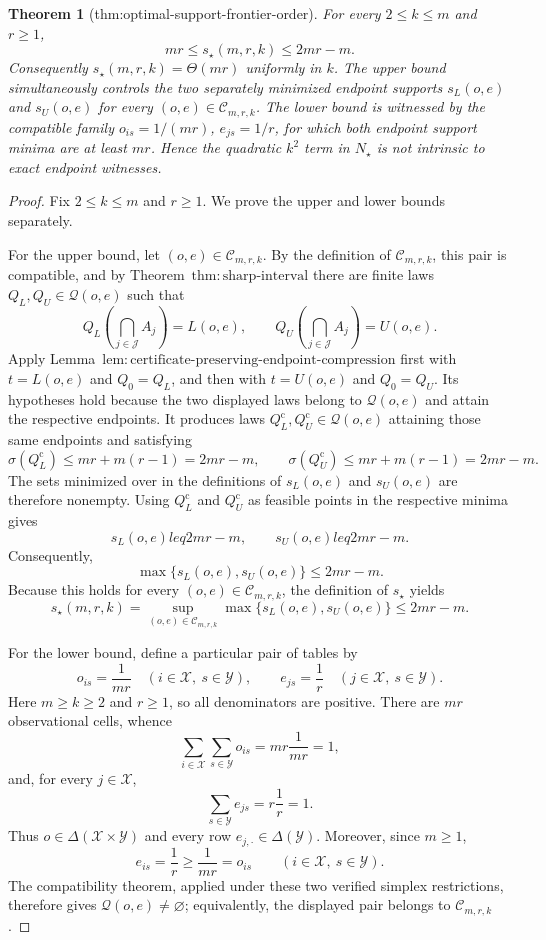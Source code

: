 \documentclass{article}
\newtheorem{theorem}{Theorem}
\begin{document}
\begin{theorem}[thm:optimal-support-frontier-order]\label{thm:optimal-support-frontier-order}
For every \(2\leq k\leq m\) and \(r\geq1\),
\[
 mr\leq s_\star(m,r,k)\leq 2mr-m.
\]
Consequently \(s_\star(m,r,k)=\Theta(mr)\) uniformly in \(k\).  The upper bound simultaneously controls the two separately minimized endpoint supports \(s_L(o,e)\) and \(s_U(o,e)\) for every \((o,e)\in\mathcal C_{m,r,k}\).  The lower bound is witnessed by the compatible family \(o_{is}=1/(mr)\), \(e_{js}=1/r\), for which both endpoint support minima are at least \(mr\).  Hence the quadratic \(k^2\) term in \(N_\star\) is not intrinsic to exact endpoint witnesses.
\end{theorem}
\begin{proof}
Fix \(2\leq k\leq m\) and \(r\geq1\).  We prove the upper and lower bounds separately.

For the upper bound, let \((o,e)\in\mathcal C_{m,r,k}\).  By the definition of \(\mathcal C_{m,r,k}\), this pair is compatible, and by Theorem~\(\mathrm{thm{:}sharp\mbox{-}interval}\) there are finite laws \(Q_L,Q_U\in\mathcal Q(o,e)\) such that
\[
 Q_L\!\left(\bigcap_{j\in\mathcal J}A_j\right)=L(o,e),
 \qquad
 Q_U\!\left(\bigcap_{j\in\mathcal J}A_j\right)=U(o,e).
\]
Apply Lemma~\(\mathrm{lem{:}certificate\mbox{-}preserving\mbox{-}endpoint\mbox{-}compression}\) first with \(t=L(o,e)\) and \(Q_0=Q_L\), and then with \(t=U(o,e)\) and \(Q_0=Q_U\).  Its hypotheses hold because the two displayed laws belong to \(\mathcal Q(o,e)\) and attain the respective endpoints.  It produces laws \(Q_L^{\mathrm c},Q_U^{\mathrm c}\in\mathcal Q(o,e)\) attaining those same endpoints and satisfying
\[
 \sigma(Q_L^{\mathrm c})\leq mr+m(r-1)=2mr-m,
 \qquad
 \sigma(Q_U^{\mathrm c})\leq mr+m(r-1)=2mr-m.
\]
The sets minimized over in the definitions of \(s_L(o,e)\) and \(s_U(o,e)\) are therefore nonempty.  Using \(Q_L^{\mathrm c}\) and \(Q_U^{\mathrm c}\) as feasible points in the respective minima gives
\[
 s_L(o,e)leq2mr-m,
 \qquad
 s_U(o,e)leq2mr-m.
\]
Consequently,
\[
 \max\{s_L(o,e),s_U(o,e)\}\leq2mr-m.
\]
Because this holds for every \((o,e)\in\mathcal C_{m,r,k}\), the definition of \(s_\star\) yields
\[
 s_\star(m,r,k)
 =\sup_{(o,e)\in\mathcal C_{m,r,k}}
   \max\{s_L(o,e),s_U(o,e)\}
 \leq2mr-m.
\]

For the lower bound, define a particular pair of tables by
\[
 o_{is}=\frac{1}{mr}
 \quad(i\in\mathcal X,\ s\in\mathcal Y),
 \qquad
 e_{js}=\frac{1}{r}
 \quad(j\in\mathcal X,\ s\in\mathcal Y).
\]
Here \(m\geq k\geq2\) and \(r\geq1\), so all denominators are positive.  There are \(mr\) observational cells, whence
\[
 \sum_{i\in\mathcal X}\sum_{s\in\mathcal Y}o_{is}
 =mr\frac{1}{mr}=1,
\]
and, for every \(j\in\mathcal X\),
\[
 \sum_{s\in\mathcal Y}e_{js}=r\frac{1}{r}=1.
\]
Thus \(o\in\Delta(\mathcal X\times\mathcal Y)\) and every row \(e_{j,\cdot}\in\Delta(\mathcal Y)\).  Moreover, since \(m\geq1\),
\[
 e_{is}=\frac1r\geq\frac1{mr}=o_{is}
 \qquad(i\in\mathcal X,\ s\in\mathcal Y).
\]
The compatibility theorem, applied under these two verified simplex restrictions, therefore gives \(\mathcal Q(o,e)\neq\varnothing\); equivalently, the displayed pair belongs to \(\mathcal C_{m,r,k}\).


\end{proof}
\end{document}
